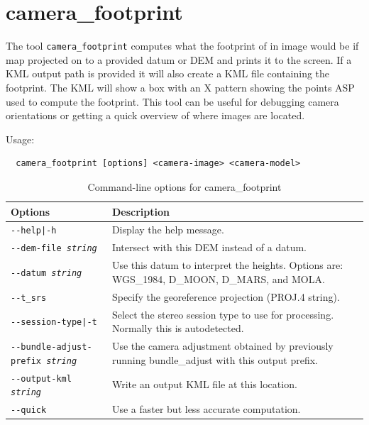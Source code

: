 \clearpage


\section{camera\_footprint}
\label{camerafootprint}

The tool \texttt{camera\_footprint} computes what the footprint of in image would be
if map projected on to a provided datum or DEM and prints it to the screen.  If a KML
output path is provided it will also create a KML file containing the footprint.  The
KML will show a box with an X pattern showing the points ASP used to compute the footprint.
This tool can be useful for debugging camera orientations or getting a quick overview
of where images are located.

Usage:
\begin{verbatim}
  camera_footprint [options] <camera-image> <camera-model>
\end{verbatim}

\begin{longtable}{|l|p{9.5cm}|}
\caption{Command-line options for camera\_footprint}
\label{tbl:camerafootprint}
\endfirsthead
\endhead
\endfoot
\endlastfoot
\hline
Options & Description \\ \hline \hline
\texttt{-\/-help|-h} & Display the help message. \\ \hline
\texttt{-\/-dem-file \textit{string}} & Intersect with this DEM instead of a datum. \\ \hline
\texttt{-\/-datum \textit{string}} & Use this datum to interpret the heights.
Options are: WGS\_1984, D\_MOON, D\_MARS, and MOLA. \\ \hline
\texttt{-\/-t\_srs} & Specify the georeference projection (PROJ.4 string).\\ \hline
\texttt{-\/-session-type|-t} & Select the stereo session type to use for processing. Normally this is autodetected. \\ \hline
\texttt{-\/-bundle-adjust-prefix \textit{string}} & Use the camera
adjustment obtained by previously running bundle\_adjust with this
output prefix. \\ \hline
\texttt{-\/-output-kml \textit{string}} & Write an output KML file at this location. \\ \hline
\texttt{-\/-quick} & Use a faster but less accurate computation.\\ \hline
\end{longtable}

\clearpage

